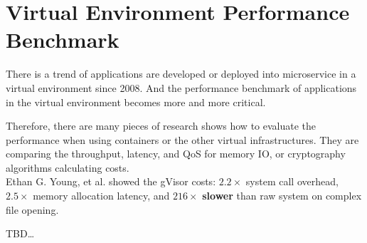 \section{Virtual Environment Performance Benchmark}
There is a trend of applications are developed or deployed into microservice in a virtual
environment since 2008. And the performance benchmark of applications in the virtual
environment becomes more and more critical.

Therefore, there are many pieces of research shows how to evaluate the performance when
using containers or the other virtual infrastructures\cite{7371699,KOZHIRBAYEV2017175,7095802,234857}.
They are comparing the throughput, latency, and QoS for memory IO, or cryptography 
algorithms calculating costs.\\

Ethan G. Young, et al.\cite{234857} showed the gVisor costs: $2.2\times$ system call overhead,
$2.5\times$ memory allocation latency, and $216\times$ \textbf{slower} than raw system on
complex file opening.

TBD\dots
